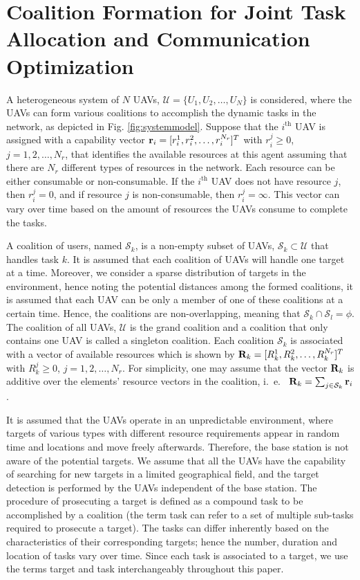 \documentclass[conference]{IEEEtran}
\theoremstyle{remark}
\theoremstyle{lemma}
\def\bR{{\bf R}}
\def\br{{\bf r}}
\begin{document}
\section{Coalition Formation for Joint Task Allocation and Communication Optimization} \label{sec:SystemModel}
A heterogeneous system of $N$ UAVs, $\mathcal{U} = \{U_1,U_2,\dots,U_{N}\}$ is considered, where the UAVs can form various coalitions to accomplish the dynamic tasks in the network, as depicted in Fig. \ref{fig:systemmodel}. Suppose that the $i^{\text{th}}$ UAV is assigned with a capability vector $\br_i = [r_i^1,r_i^2, \ldots, r_i^{N_r}]^T$ with $r_i^j \geq 0$, $j = 1, 2, \ldots, N_r$, that identifies the available resources at this agent assuming that there are $N_r$ different types of resources in the network. Each resource can be either consumable or non-consumable. If the $i^{\text{th}}$ UAV does not have resource $j$, then $r_i^j = 0$, and if resource $j$ is non-consumable, then $r_i^j = \infty$. This vector can vary over time based on the amount of resources the UAVs consume to complete the tasks.


A coalition of users, named $\mathcal{S}_k$, is a non-empty subset of UAVs, $\mathcal{S}_k \subset \mathcal{U}$ that handles task $k$. It is assumed that each coalition of UAVs will handle one target at a time. Moreover, we consider a sparse distribution of targets in the environment, hence noting the potential distances among the formed coalitions, it is assumed that each UAV can be only a member of one of these coalitions at a certain time. Hence, the coalitions are non-overlapping, meaning that $\mathcal{S}_k \cap \mathcal{S}_l=\phi$. The coalition of all UAVs, $\mathcal{U}$ is the grand coalition and a coalition that only contains one UAV is called a singleton coalition. Each coalition $\mathcal{S}_k$ is associated with a vector of available resources which is shown by $\bR_k = [R_k^1,R_k^2,\ldots,R_k^{N_r}]^T$ with $R_k^{j} \geq 0$, $j = 1,2,\ldots,N_r$. For simplicity, one may assume that the vector $\bR_k$ is additive over the elements' resource vectors in the coalition, i.~e.~ $\bR_k = \sum_{j \in \mathcal{S}_k}{\br_i}$.

It is assumed that the UAVs operate in an unpredictable environment, where targets of various types with different resource requirements appear in random time and locations and move freely afterwards. Therefore, the base station is not aware of the potential targets. We assume that all the UAVs have the capability of searching for new targets in a limited geographical field, and the target detection is performed by the UAVs independent of the base station. The procedure of prosecuting a target is defined as a compound task to be accomplished by a coalition (the term task can refer to a set of multiple sub-tasks required to prosecute a target). The tasks can differ inherently based on the characteristics of their corresponding targets; hence the number, duration and location of tasks vary over time. Since each task is associated to a target, we use the terms target and task interchangeably throughout this paper.
\end{document}
